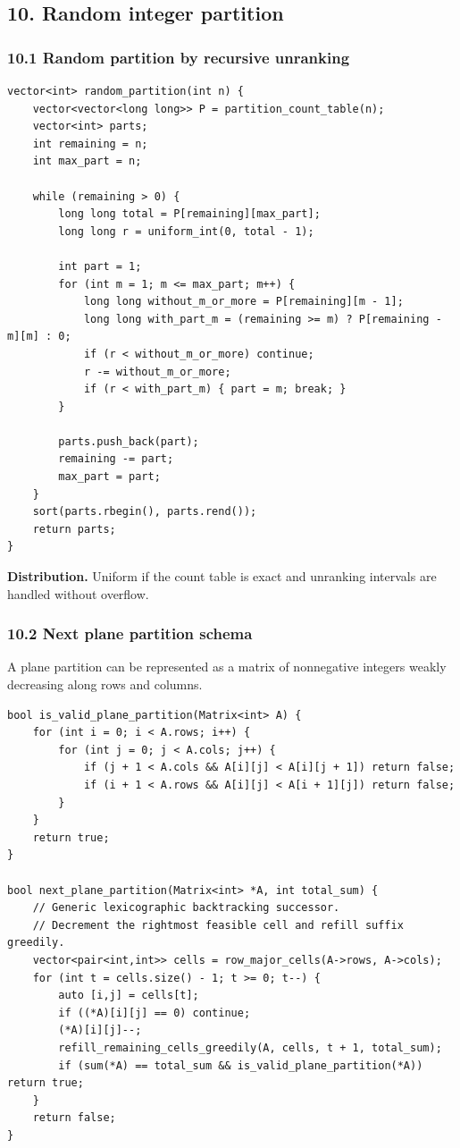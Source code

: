 \documentclass[11pt]{article}
\begin{document}
\subsection{10. Random integer partition}\label{random-integer-partition}

\subsubsection{10.1 Random partition by recursive unranking}\label{random-partition-by-recursive-unranking}

\begin{verbatim}
vector<int> random_partition(int n) {
    vector<vector<long long>> P = partition_count_table(n);
    vector<int> parts;
    int remaining = n;
    int max_part = n;

    while (remaining > 0) {
        long long total = P[remaining][max_part];
        long long r = uniform_int(0, total - 1);

        int part = 1;
        for (int m = 1; m <= max_part; m++) {
            long long without_m_or_more = P[remaining][m - 1];
            long long with_part_m = (remaining >= m) ? P[remaining - m][m] : 0;
            if (r < without_m_or_more) continue;
            r -= without_m_or_more;
            if (r < with_part_m) { part = m; break; }
        }

        parts.push_back(part);
        remaining -= part;
        max_part = part;
    }
    sort(parts.rbegin(), parts.rend());
    return parts;
}
\end{verbatim}

\textbf{Distribution.} Uniform if the count table is exact and unranking intervals are handled without overflow.

\subsubsection{10.2 Next plane partition schema}\label{next-plane-partition-schema}

A plane partition can be represented as a matrix of nonnegative integers weakly decreasing along rows and columns.

\begin{verbatim}
bool is_valid_plane_partition(Matrix<int> A) {
    for (int i = 0; i < A.rows; i++) {
        for (int j = 0; j < A.cols; j++) {
            if (j + 1 < A.cols && A[i][j] < A[i][j + 1]) return false;
            if (i + 1 < A.rows && A[i][j] < A[i + 1][j]) return false;
        }
    }
    return true;
}

bool next_plane_partition(Matrix<int> *A, int total_sum) {
    // Generic lexicographic backtracking successor.
    // Decrement the rightmost feasible cell and refill suffix greedily.
    vector<pair<int,int>> cells = row_major_cells(A->rows, A->cols);
    for (int t = cells.size() - 1; t >= 0; t--) {
        auto [i,j] = cells[t];
        if ((*A)[i][j] == 0) continue;
        (*A)[i][j]--;
        refill_remaining_cells_greedily(A, cells, t + 1, total_sum);
        if (sum(*A) == total_sum && is_valid_plane_partition(*A)) return true;
    }
    return false;
}
\end{verbatim}
\end{document}
